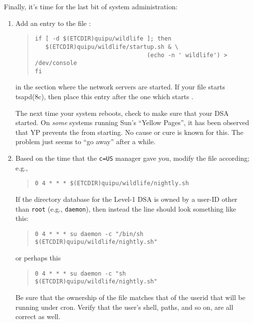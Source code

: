 Finally,
it's time for the last bit of system administration:
\begin{enumerate}
\item	Add an entry to the file :
\begin{quote}\smaller\begin{verbatim}
if [ -d $(ETCDIR)quipu/wildlife ]; then
   $(ETCDIR)quipu/wildlife/startup.sh & \
                                (echo -n ' wildlife') > /dev/console
fi
\end{verbatim}\end{quote}
in the section where the network servers are started.
If your  file starts \man tsapd(8c),
then place this entry after the one which starts .

The next time your system reboots,
check to make sure that your DSA started.
On {\em some\/} systems running Sun's ``Yellow Pages'',
it has been observed that YP prevents the  from starting.
No cause or cure is known for this.
The problem just seems to ``go away'' after a while.

\item	Based on the time that the \verb"c=US" manager gave you,
modify the  file according; e.g.,
\begin{quote}\small\begin{verbatim}
0 4 * * * $(ETCDIR)quipu/wildlife/nightly.sh
\end{verbatim}\end{quote}
If the directory database for the Level-1 DSA is owned by a user-ID other
than \verb"root" (e.g., \verb"daemon"),
then instead the line should look something like this:
\begin{quote}\smaller\begin{verbatim}
0 4 * * * su daemon -c "/bin/sh $(ETCDIR)quipu/wildlife/nightly.sh"
\end{verbatim}\end{quote}
or perhaps
this
\begin{quote}\small\begin{verbatim}
0 4 * * * su daemon -c "sh $(ETCDIR)quipu/wildlife/nightly.sh"
\end{verbatim}\end{quote}
Be sure that the ownership of the  file matches that of the
userid that will be running under cron.
Verify that the user's shell, paths, and so on, are all correct as well.
\end{enumerate}

